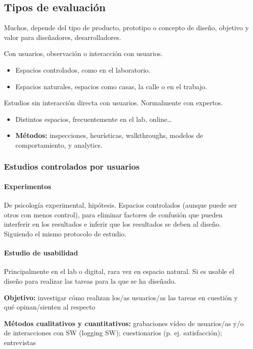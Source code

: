 \documentclass[12pt, twoside, openright]{report} %
\begin{document}
\subsection{Tipos de evaluación}
Muchos, depende del tipo de producto, prototipo o concepto de diseño, objetivo y valor para diseñadores, desarrolladores.

Con usuarios, observación o interacción con usuarios.
\begin{itemize}
	\item Espacios controlados, como en el laboratorio.
	\item Espacios naturales, espacios como casas, la calle o en el trabajo.
\end{itemize}

Estudios sin interacción directa con usuarios. Normalmente con expertos.
\begin{itemize}
	\item Distintos espacios, frecuentemente en el lab, online…
	\item \textbf{Métodos:} inspecciones, heurísticas, walkthroughs, modelos de comportamiento, y analytics.
\end{itemize}

\subsubsection{Estudios controlados por usuarios}
\paragraph{Experimentos}
De psicología experimental, hipótesis. Espacios controlados (aunque puede ser otros con menos control), para eliminar factores de confusión que pueden interferir en los resultados e inferir que los resultados se deben al diseño. Siguiendo el mismo protocolo de estudio.

\paragraph{Estudio de usabilidad}
Principalmente en el lab o digital, rara vez en espacio natural. Si es usable el diseño para realizar las tareas para la que se ha diseñado.

\textbf{Objetivo:} investigar cómo realizan los/as usuarios/as las tareas en cuestión y qué opinan/sienten al respecto

\textbf{Métodos cualitativos y cuantitativos:} grabaciones vídeo de usuarios/as y/o de interacciones con SW (logging SW); cuestionarios (p. ej. satisfacción); entrevistas
\end{document}
